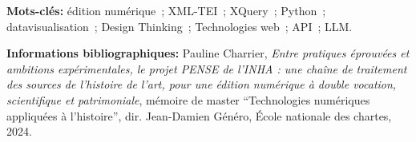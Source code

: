 	\textbf{Mots-clés:} édition numérique~; XML-TEI~; XQuery~; Python~; datavisualisation~; Design Thinking~; Technologies web~; API~; LLM.
	
	\textbf{Informations bibliographiques:} Pauline Charrier, \textit{Entre pratiques éprouvées et ambitions expérimentales, le projet PENSE de l’INHA : une chaîne de traitement des sources de l’histoire de l’art, pour une édition numérique à double vocation, scientifique et patrimoniale}, mémoire de master \enquote{Technologies numériques appliquées à l'histoire}, dir. Jean-Damien Généro, École nationale des chartes, 2024.
	
		\newpage{\pagestyle{empty}\cleardoublepage}